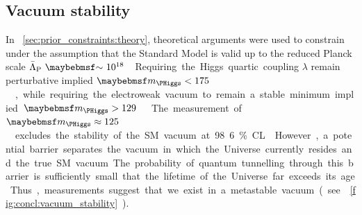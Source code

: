 \subsection{Vacuum stability}
\label{sec:implications:vacuum}

In \Section~\ref{sec:prior_constraints:theory}, theoretical arguments were used to 
constrain \mH under the assumption that the Standard Model is valid up to the reduced 
Planck scale \unit{$\bar{\Lambda}_{\text{P}}~\about~10^{18}$}{\GeV}. Requiring the Higgs 
quartic coupling $\lambda$ remain perturbative implied \unit{$\mH < 175$}{\GeV}, while 
requiring the electroweak vacuum to remain a stable minimum implied 
\unit{$\mH > 129$}{\GeV} \cite{Ellis:2009}. 

The measurement of \unit{$\mH \approx 125$}{\GeV} excludes the stability of the SM vacuum at 
98.6\% CL \cite{Degrassi:vacuum}. However, a potential barrier separates the vacuum in 
which the Universe currently resides and the true SM vacuum. The probability of quantum 
tunnelling through this barrier is sufficiently small that the lifetime of the Universe 
far exceeds its age. Thus, measurements suggest that we exist in a metastable vacuum (see 
\Figure~\ref{fig:concl:vacuum_stability}).

